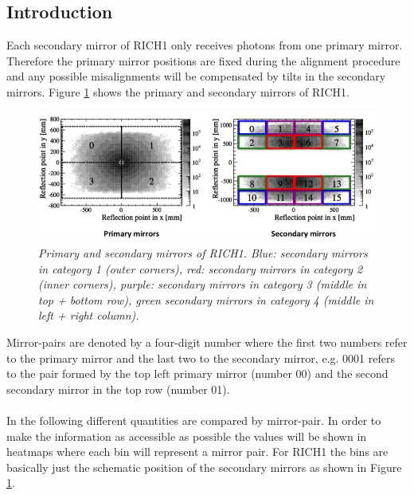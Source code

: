 \subsection{Introduction}
Each secondary mirror of RICH1 only receives photons from one primary mirror. Therefore the primary mirror positions are fixed during the alignment procedure and any possible misalignments will be compensated by tilts in the secondary mirrors. Figure \ref{fig:rich1mirr} shows the primary and secondary mirrors of RICH1. \\
\begin{figure}[!h]
	\vspace*{-0.cm}
	\begin{center}
		\includegraphics[width=1.\textwidth]{rich1mirrors.png}
		\vspace*{-1.5cm}
	\end{center}
	\caption{\textit{Primary and secondary mirrors of RICH1. Blue: secondary mirrors in category 1 (outer corners), red: secondary mirrors in category 2 (inner corners), purple: secondary mirrors in category 3 (middle in top + bottom row), green secondary mirrors in category 4 (middle in left + right column).}}
	\label{fig:rich1mirr}
\end{figure}
Mirror-pairs are denoted by a four-digit number where the first two numbers refer to the primary mirror and the last two to the secondary mirror, e.g. 0001 refers to the pair formed by the top left primary mirror (number 00) and the second secondary mirror in the top row (number 01).\\
\\
In the following different quantities are compared by mirror-pair. In order to make the information as accessible as possible the values will be shown in heatmaps where each bin will represent a mirror pair. For RICH1 the bins are basically just the schematic position of the secondary mirrors as shown in Figure \ref{fig:rich1mirr}.\\


